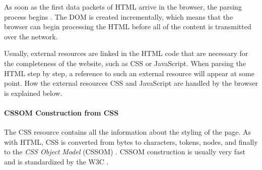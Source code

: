 

As soon as the first data packets of HTML arrive in the browser, the parsing process begins \cite{2021MDNHowBrowsersWork}.
The DOM is created incrementally, which means that the browser can begin processing the HTML before all of the content is transmitted over the network.


Usually, external resources are linked in the HTML code that are necessary for the completeness of the website, such as CSS or JavaScript.
When parsing the HTML step by step, a reference to such an external resource will appear at some point.
How the external resources CSS and JavaScript are handled by the browser is explained below.






\paragraph{CSSOM Construction from CSS} %


The CSS resource contains all the information about the styling of the page.
As with HTML, CSS is converted from bytes to characters, tokens, nodes, and finally to the \textit{CSS Object Model} (CSSOM) \cite{2019GrigorikDOM}.
CSSOM construction is usually very fast and is standardized by the W3C \cite{2021MDNHowBrowsersWork}.



